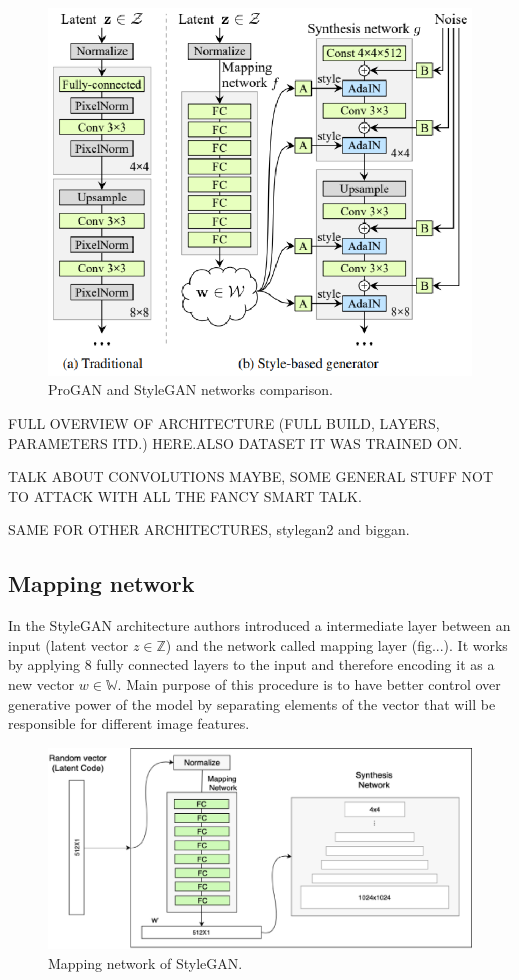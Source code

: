 \documentclass[12pt,a4paper,openany]{book}
\begin{document}
\begin{figure}[ht!]
    \centering
    \includegraphics[scale=1.5]{figs/stylegan-scheme.eps}
    \caption{ProGAN and StyleGAN networks comparison.}\label{Fig:STYLEGAN}
\end{figure}


FULL OVERVIEW OF ARCHITECTURE (FULL BUILD, LAYERS, PARAMETERS ITD.) HERE.ALSO DATASET IT WAS TRAINED ON.

TALK ABOUT CONVOLUTIONS MAYBE, SOME GENERAL STUFF NOT TO ATTACK WITH ALL THE FANCY SMART TALK.

SAME FOR OTHER ARCHITECTURES, stylegan2 and biggan.

\subsection{Mapping network}

In the StyleGAN architecture authors introduced a intermediate layer between an input (latent vector $z \in \mathbb{Z}$) and the network called mapping layer (fig...). It works by applying 8 fully connected layers to the input and therefore encoding it as a new vector $w \in \mathbb{W}$. Main purpose of this procedure is to have better control over generative power of the model by separating elements of the vector that will be responsible for different image features.


\begin{figure}[ht!]
    \centering
    \includegraphics[scale=0.3]{figs/mapping-network.eps}
    \caption{Mapping network of StyleGAN.}\label{Fig:STYLEGAN}
\end{figure}
\end{document}
